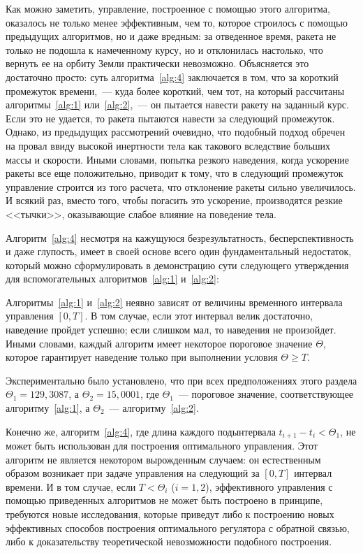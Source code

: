 Как можно заметить, управление, построенное с помощью этого алгоритма, оказалось не только менее эффективным, чем то, которое строилось с помощью предыдущих алгоритмов, но и даже вредным: за отведенное время, ракета не только не подошла к намеченному курсу, но и отклонилась настолько, что вернуть ее на орбиту Земли практически невозможно. Объясняется это достаточно просто: суть алгоритма~\ref{alg:4} заключается в том, что за короткий промежуток времени,~--- куда более короткий, чем тот, на который рассчитаны алгоритмы~\ref{alg:1} или~\ref{alg:2},~--- он пытается навести ракету на заданный курс. Если это не удается, то ракета пытаются навести за следующий промежуток. Однако, из предыдущих рассмотрений очевидно, что подобный подход обречен на провал ввиду высокой инертности тела как такового вследствие больших массы и скорости. Иными словами, попытка резкого наведения, когда ускорение ракеты все еще положительно, приводит к тому, что в следующий промежуток управление строится из того расчета, что отклонение ракеты сильно увеличилось. И всякий раз, вместо того, чтобы погасить это ускорение, производятся резкие <<тычки>>, оказывающие слабое влияние на поведение тела.

Алгоритм~\ref{alg:4} несмотря на кажущуюся безрезультатность, бесперспективность и даже глупость, имеет в своей основе всего один фундаментальный недостаток, который можно сформулировать в демонстрацию сути следующего утверждения для вспомогательных алгоритмов~\ref{alg:1} и~\ref{alg:2}:

\begin{statement}
    Алгоритмы~\ref{alg:1} и~\ref{alg:2} неявно зависят от величины временного интервала управления $[0,T]$. В том случае, если этот интервал велик достаточно, наведение пройдет успешно; если слишком мал, то наведения не произойдет. Иными словами, каждый алгоритм имеет некоторое пороговое значение $\Theta$, которое гарантирует наведение только при выполнении условия $\Theta \geqslant T$.
\end{statement}

Экспериментально было установлено, что при всех предположениях этого раздела $\Theta_1=129,3087$, а $\Theta_2=15,0001$, где $\Theta_1$~--- пороговое значение, соответствующее алгоритму~\ref{alg:1}, а $\Theta_2$~--- алгоритму~\ref{alg:2}.

Конечно же, алгоритм~\ref{alg:4}, где длина каждого подынтервала $t_{i+1}-t_i < \Theta_1$, не может быть использован для построения оптимального управления. Этот алгоритм не является некотором вырожденным случаем: он естественным образом возникает при задаче управления на следующий за $[0,T]$ интервал времени. И в том случае, если $T<\Theta_i$ ($i=1,2$), эффективного управления с помощью приведенных алгоритмов не может быть построено в принципе, требуются новые исследования, которые приведут либо к построению новых эффективных способов построения оптимального регулятора с обратной связью, либо к доказательству теоретической невозможности подобного построения.
